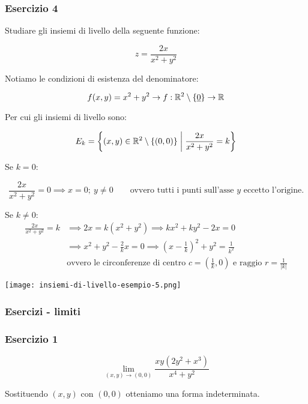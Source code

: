 \filbreak{}
\subsubsection*{Esercizio 4}

Studiare gli insiemi di livello della seguente funzione:

\[
    z = \frac{2x}{x^2+y^2}
\]

Notiamo le condizioni di esistenza del denominatore:

\[f(x,y) = x^2 + y^2 \to f: \R^2 \setminus \{\uzero \} \to \R \]

Per cui gli insiemi di livello sono:

\[E_k = \left\{ (x,y) \in \R^2 \setminus \{(0,0)\} \giventhat[\bigg] \frac{2x}{x^2+y^2} = k \right\} \]

Se \(k=0\):

\[
    \frac{2x}{x^2+y^2} = 0 \implies x = 0;\ y \ne 0 \qquad \text{ovvero tutti i punti sull'asse \(y\) eccetto l'origine.}
\]

Se \(k \ne 0\):
\begin{align*}
    \frac{2x}{x^2+y^2} = k & \implies 2x = k (x^2+y^2) \implies kx^2 + ky^2 -2x = 0                                                        \\
                           & \implies x^2 + y^2 -\frac{2}{k}x = 0 \implies {\left( x-\frac{1}{k} \right)}^2 + y^2 = \frac{1}{k^2}          \\
                           & \text{ovvero le circonferenze di centro } c=\left( \frac{1}{k}, 0 \right) \text{ e raggio } r = \frac{1}{|k|}
\end{align*}
\begin{center}
    \texttt{[image: insiemi-di-livello-esempio-5.png]}
\end{center}

\pagebreak
\subsubsection{Esercizi {-} limiti}

\subsubsection*{Esercizio 1}

\[
    \lim_{ (x,y) \to (0,0) } \frac{xy(2y^{2}+x^{3})}{x^{4}+y^{2}}
\]

Sostituendo \((x,y)\) con \((0,0)\) otteniamo una forma indeterminata.

